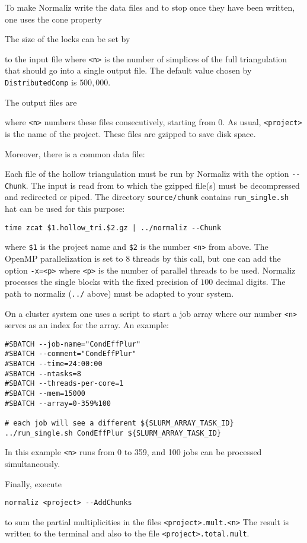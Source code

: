 To make Normaliz write the data files and to stop once they have been written, one uses the cone property
\begin{itemize}
	\itemtt[DistributedComp] 
\end{itemize}
The size of the locks can be set by
\begin{itemize}
\end{itemize}
to the input file where \verb|<n>| is the number of simplices of the full triangulation that should go into a single output file.  The default value chosen by \verb|DistributedComp| is $500,000$.

The output files are
\begin{itemize}
\end{itemize}
where \verb|<n>| numbers these files consecutively, starting from $0$. As usual, \verb|<project>| is the name of the project. These files are gzipped to save disk space.

Moreover, there is a common data file:
\begin{itemize}
\end{itemize}

Each file of the hollow triangulation must be run by  Normaliz with the option \verb|--Chunk|. The input is read from  to which the gzipped file(s) must be decompressed and redirected or piped. The directory \verb|source/chunk| contains \verb|run_single.sh| hat can be used for this purpose:
\begin{Verbatim}
time zcat $1.hollow_tri.$2.gz | ../normaliz --Chunk 
\end{Verbatim}
where \verb|$1| is the project name and \verb|$2| is the number \verb|<n>| from above. The OpenMP parallelization is set to $8$ threads by this call, but one can add the option \verb|-x=<p>| where \verb|<p>| is the number of parallel threads to be used. Normaliz processes the single blocks with the fixed precision of $100$ decimal digits. The path to normaliz (\verb|../| above) must be adapted to your system.

On a cluster system one uses a script to start a job array where our number \verb|<n>| serves as an index for the array. An example:
\begin{Verbatim}
#SBATCH --job-name="CondEffPlur"
#SBATCH --comment="CondEffPlur"
#SBATCH --time=24:00:00
#SBATCH --ntasks=8
#SBATCH --threads-per-core=1
#SBATCH --mem=15000
#SBATCH --array=0-359%100

# each job will see a different ${SLURM_ARRAY_TASK_ID}
../run_single.sh CondEffPlur ${SLURM_ARRAY_TASK_ID}
\end{Verbatim}
In this example \verb|<n>| runs from 0 to 359, and 100 jobs can be processed simultaneously.

Finally, execute 
\begin{Verbatim}
normaliz <project> --AddChunks
\end{Verbatim}
to sum the partial multiplicities in the files \verb|<project>.mult.<n>| The result is written to the terminal and also to the file \verb|<project>.total.mult|.


